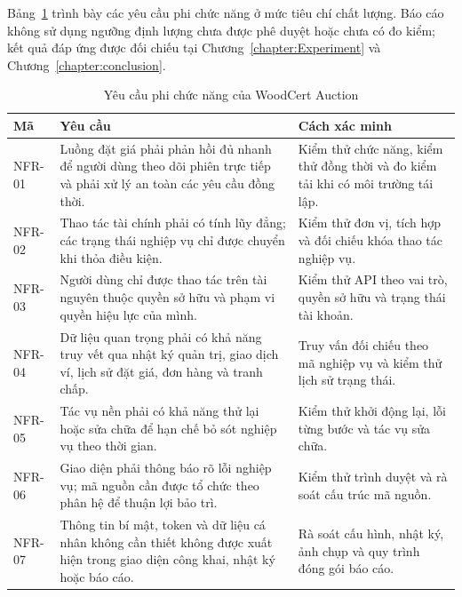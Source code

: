 \documentclass[../DoAn.tex]{subfiles}
\begin{document}
Bảng~\ref{tab:non-functional-requirements} trình bày các yêu cầu phi chức năng ở mức tiêu chí chất lượng. Báo cáo không sử dụng ngưỡng định lượng chưa được phê duyệt hoặc chưa có đo kiểm; kết quả đáp ứng được đối chiếu tại Chương~\ref{chapter:Experiment} và Chương~\ref{chapter:conclusion}.

\begin{table}[htbp]
    \centering
    \caption{Yêu cầu phi chức năng của WoodCert Auction}
    \label{tab:non-functional-requirements}
    \scriptsize
    \setlength{\tabcolsep}{4pt}
    \renewcommand{\arraystretch}{1.03}
    \begin{tabular}{|>{\raggedright\arraybackslash}p{}|>{\raggedright\arraybackslash}p{}|>{\raggedright\arraybackslash}p{}|}
        \hline
        \textbf{Mã} & \textbf{Yêu cầu} & \textbf{Cách xác minh} \\
        \hline
        NFR-01 & Luồng đặt giá phải phản hồi đủ nhanh để người dùng theo dõi phiên trực tiếp và phải xử lý an toàn các yêu cầu đồng thời. & Kiểm thử chức năng, kiểm thử đồng thời và đo kiểm tải khi có môi trường tái lập. \\
        \hline
        NFR-02 & Thao tác tài chính phải có tính lũy đẳng; các trạng thái nghiệp vụ chỉ được chuyển khi thỏa điều kiện. & Kiểm thử đơn vị, tích hợp và đối chiếu khóa thao tác nghiệp vụ. \\
        \hline
        NFR-03 & Người dùng chỉ được thao tác trên tài nguyên thuộc quyền sở hữu và phạm vi quyền hiệu lực của mình. & Kiểm thử API theo vai trò, quyền sở hữu và trạng thái tài khoản. \\
        \hline
        NFR-04 & Dữ liệu quan trọng phải có khả năng truy vết qua nhật ký quản trị, giao dịch ví, lịch sử đặt giá, đơn hàng và tranh chấp. & Truy vấn đối chiếu theo mã nghiệp vụ và kiểm thử lịch sử trạng thái. \\
        \hline
        NFR-05 & Tác vụ nền phải có khả năng thử lại hoặc sửa chữa để hạn chế bỏ sót nghiệp vụ theo thời gian. & Kiểm thử khởi động lại, lỗi từng bước và tác vụ sửa chữa. \\
        \hline
        NFR-06 & Giao diện phải thông báo rõ lỗi nghiệp vụ; mã nguồn cần được tổ chức theo phân hệ để thuận lợi bảo trì. & Kiểm thử trình duyệt và rà soát cấu trúc mã nguồn. \\
        \hline
        NFR-07 & Thông tin bí mật, token và dữ liệu cá nhân không cần thiết không được xuất hiện trong giao diện công khai, nhật ký hoặc báo cáo. & Rà soát cấu hình, nhật ký, ảnh chụp và quy trình đóng gói báo cáo. \\
        \hline
    \end{tabular}
\end{table}
\end{document}
